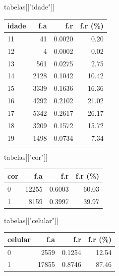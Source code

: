 \documentclass[
]{article}
\newenvironment{Shaded}{\begin{snugshade}}{\end{snugshade}}
\newcommand{\NormalTok}[1]{\textcolor[rgb]{0.00,0.23,0.31}{#1}}
\newcommand{\StringTok}[1]{\textcolor[rgb]{0.13,0.47,0.30}{#1}}
\begin{document}
\begin{Shaded}
\begin{Highlighting}[]
\NormalTok{tabelas[[}\StringTok{"idade"}\NormalTok{]]}
\end{Highlighting}
\end{Shaded}

\begin{longtable}[]{@{}lrrr@{}}
\toprule()
idade & f.a & f.r & f.r (\%) \\
\midrule()
\endhead
11 & 41 & 0.0020 & 0.20 \\
12 & 4 & 0.0002 & 0.02 \\
13 & 561 & 0.0275 & 2.75 \\
14 & 2128 & 0.1042 & 10.42 \\
15 & 3339 & 0.1636 & 16.36 \\
16 & 4292 & 0.2102 & 21.02 \\
17 & 5342 & 0.2617 & 26.17 \\
18 & 3209 & 0.1572 & 15.72 \\
19 & 1498 & 0.0734 & 7.34 \\
\bottomrule()
\end{longtable}

\begin{Shaded}
\begin{Highlighting}[]
\NormalTok{tabelas[[}\StringTok{"cor"}\NormalTok{]]}
\end{Highlighting}
\end{Shaded}

\begin{longtable}[]{@{}lrrr@{}}
\toprule()
cor & f.a & f.r & f.r (\%) \\
\midrule()
\endhead
0 & 12255 & 0.6003 & 60.03 \\
1 & 8159 & 0.3997 & 39.97 \\
\bottomrule()
\end{longtable}

\begin{Shaded}
\begin{Highlighting}[]
\NormalTok{tabelas[[}\StringTok{"celular"}\NormalTok{]]}
\end{Highlighting}
\end{Shaded}

\begin{longtable}[]{@{}lrrr@{}}
\toprule()
celular & f.a & f.r & f.r (\%) \\
\midrule()
\endhead
0 & 2559 & 0.1254 & 12.54 \\
1 & 17855 & 0.8746 & 87.46 \\
\bottomrule()
\end{longtable}
\end{document}
